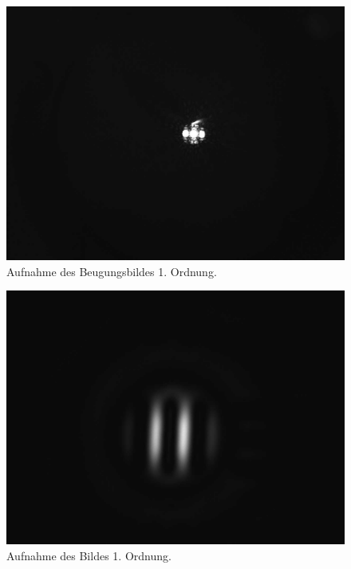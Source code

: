 \documentclass{article}
\begin{document}
\begin{minipage}[t]{.45\textwidth}
\begin{figure}[H]
\includegraphics[scale=0.1]{tm/Beugungsbild_1.jpg}
\caption{Aufnahme des Beugungsbildes 1. Ordnung.}
\label{fig:bbild_1_tm}
\end{figure}
\end{minipage}
\hfill
\noindent
\begin{minipage}[t]{.45\textwidth}
\begin{figure}[H]
\includegraphics[scale=0.1]{tm/Bild_1.jpg}
\caption{Aufnahme des Bildes 1. Ordnung.}
\label{fig:bild_1_tm}
\end{figure}
\end{minipage}
\end{document}
